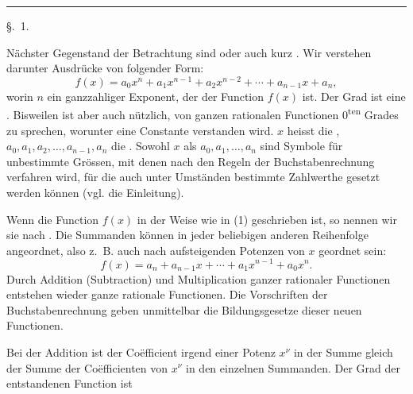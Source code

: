 \thispagestyle{empty}
\begin{center}
{\large{}}

\vspace{0.8em}
{\Large{}}

\vspace{0.8em}
\rule{0.16\linewidth}{0.4pt}

\vspace{0.8em}
{\large \S.\ 1.}

\vspace{0.5em}
{\large{}}
\end{center}

Nächster Gegenstand der Betrachtung sind 
oder auch kurz . Wir
verstehen darunter Ausdrücke von folgender Form:
\begin{equation}
 f(x)=a_0x^n+a_1x^{n-1}+a_2x^{n-2}+\cdots+a_{n-1}x+a_n,
\tag{1}
\end{equation}
worin $n$ ein ganzzahliger Exponent, der  der Function $f(x)$ ist.
Der Grad ist eine . Bisweilen ist aber auch
nützlich, von ganzen rationalen Functionen
0\textsuperscript{ten} Grades zu sprechen, worunter eine Constante
verstanden wird. $x$ heisst die ,
$a_0,a_1,a_2,\ldots,a_{n-1},a_n$ die . Sowohl
$x$ als $a_0,a_1,\ldots,a_n$ sind Symbole für unbestimmte Grössen, mit
denen nach den Regeln der Buchstabenrechnung verfahren wird, für die
auch unter Umständen bestimmte Zahlwerthe gesetzt werden können (vgl.
die Einleitung).

Wenn die Function $f(x)$ in der Weise wie in (1) geschrieben ist, so
nennen wir sie nach .
Die Summanden können in jeder beliebigen anderen Reihenfolge
angeordnet, also z.~B. auch nach aufsteigenden Potenzen von $x$
geordnet sein:
\[
 f(x)=a_n+a_{n-1}x+\cdots+a_1x^{n-1}+a_0x^n.
\]
Durch Addition (Subtraction) und Multiplication ganzer rationaler
Functionen entstehen wieder ganze rationale Functionen. Die
Vorschriften der Buchstabenrechnung geben unmittelbar die
Bildungsgesetze dieser neuen Functionen.

Bei der Addition ist der Coëfficient irgend einer Potenz $x^\nu$ in
der Summe gleich der Summe der Coëfficienten von $x^\nu$ in den
einzelnen Summanden. Der Grad der entstandenen Function ist
